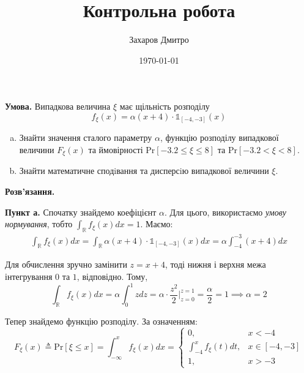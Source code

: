 \documentclass[oneside,solution]{karazin-prob-theory-assign}
\title{Контрольна робота}
\author{Захаров Дмитро}
\date{\today}
\begin{document}
\maketitle



\hspace{20px}\textbf{Умова.} Випадкова величина $\xi$ має щільність розподілу
\begin{equation}
    f_{\xi}(x) = \alpha(x+4) \cdot \mathds{1}_{[-4,-3]}(x)
\end{equation}

\begin{enumerate}[(a)]
    \item Знайти значення сталого параметру $\alpha$, функцію розподілу випадкової величини $F_{\xi}(x)$ та ймовірності $\text{Pr}[-3.2 \leq \xi \leq 8]$ та $\text{Pr}[-3.2 < \xi < 8]$.
    \item Знайти математичне сподiвання та дисперсiю випадкової величини $\xi$.
\end{enumerate}

\textbf{Розв'язання.} 

\textbf{Пункт а.} Спочатку знайдемо коефіцієнт $\alpha$. Для цього, використаємо \textit{умову нормування}, тобто $\int_{\mathbb{R}}f_{\xi}(x)dx=1$. Маємо:
\begin{gather}
    \int_{\mathbb{R}} f_{\xi}(x)dx = \int_{\mathbb{R}}\alpha(x+4) \cdot \mathds{1}_{[-4,-3]}(x)dx = \alpha \int_{-4}^{-3}(x+4)dx
\end{gather}

Для обчислення зручно замінити $z=x+4$, тоді нижня і верхня межа інтегрування $0$ та $1$, відповідно. Тому,
\begin{equation}
    \int_{\mathbb{R}}f_{\xi}(x)dx = \alpha\int_0^1 zdz = \alpha \cdot \frac{z^2}{2}\Big|_{z=0}^{z=1} = \frac{\alpha}{2} = 1 \implies \boxed{\alpha=2}
\end{equation}

Тепер знайдемо функцію розподілу. За означенням:
\begin{equation}
    F_{\xi}(x) \triangleq \text{Pr}[\xi \leq x] = \int_{-\infty}^x f_{\xi}(x)dx = \begin{cases}
        0, & x < -4 \\
        \int_{-4}^x f_{\xi}(t)dt, & x \in [-4,-3] \\
        1, & x > -3
    \end{cases}
\end{equation}
\end{document}
